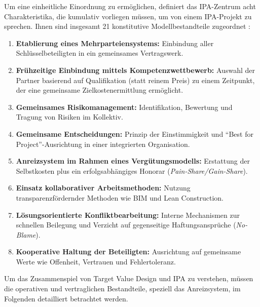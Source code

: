 

Um eine einheitliche Einordnung zu ermöglichen, definiert das \acs{IPA}-Zentrum acht Charakteristika, die kumulativ vorliegen müssen, um von einem \acs{IPA}-Projekt zu sprechen. Ihnen sind insgesamt 21 konstitutive Modellbestandteile zugeordnet \autocite[Vgl.][S.~4 ff]{bold_integrierte_2022}:

\begin{enumerate}
    \item \textbf{Etablierung eines Mehrparteiensystems:} Einbindung aller Schlüsselbeteiligten in ein gemeinsames Vertragswerk.
    \item \textbf{Frühzeitige Einbindung mittels Kompetenzwettbewerb:} Auswahl der Partner basierend auf Qualifikation (statt reinem Preis) zu einem Zeitpunkt, der eine gemeinsame Zielkostenermittlung ermöglicht.
    \item \textbf{Gemeinsames Risikomanagement:} Identifikation, Bewertung und Tragung von Risiken im Kollektiv.
    \item \textbf{Gemeinsame Entscheidungen:} Prinzip der Einstimmigkeit und \enquote{Best for Project}-Ausrichtung in einer integrierten Organisation.
    \item \textbf{Anreizsystem im Rahmen eines Vergütungsmodells:} Erstattung der Selbstkosten plus ein erfolgsabhängiges Honorar (\textit{Pain-Share/Gain-Share}).
    \item \textbf{Einsatz kollaborativer Arbeitsmethoden:} Nutzung transparenzfördernder Methoden wie \acs{BIM} und Lean Construction.
    \item \textbf{Lösungsorientierte Konfliktbearbeitung:} Interne Mechanismen zur schnellen Beilegung und Verzicht auf gegenseitige Haftungsansprüche (\textit{No-Blame}).
    \item \textbf{Kooperative Haltung der Beteiligten:} Ausrichtung auf gemeinsame Werte wie Offenheit, Vertrauen und Fehlertoleranz.
\end{enumerate}

Um das Zusammenspiel von Target Value Design und \acs{IPA} zu verstehen, müssen die operativen und vertraglichen Bestandteile, speziell das Anreizsystem, im Folgenden detailliert betrachtet werden.

